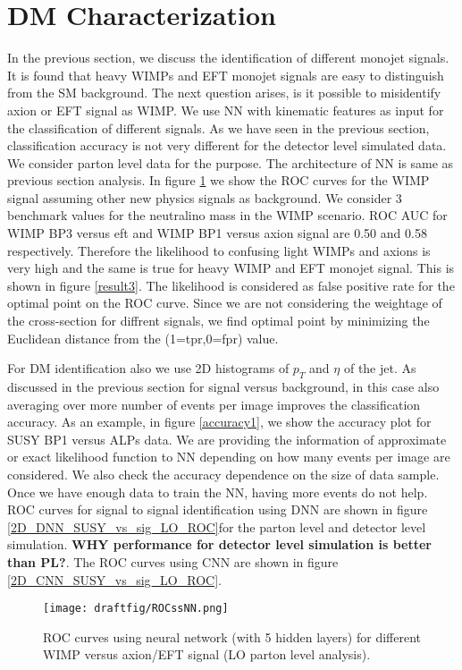 \documentclass[aps,onecolumn,showpacs,superscriptaddress,groupedaddress,nofootinbib,preprint]{revtex4-1}
\begin{document}
\section{DM Characterization}
In the previous section, we discuss the identification of different monojet signals. It is found that heavy WIMPs and EFT monojet signals are easy
to distinguish from the SM background. The next question arises, is it possible to misidentify axion or EFT signal as WIMP. We use NN with kinematic features as input for the 
classification of different signals. As we have seen in the previous section, classification accuracy is not very different for the detector level simulated data. We consider parton level data for the purpose. The architecture of NN is same as previous section analysis. In figure
\ref{result2} we show the ROC curves for the  WIMP signal assuming other new physics signals as background. We consider 3 benchmark values for
the neutralino mass in the WIMP scenario. ROC AUC for WIMP BP3 versus eft and WIMP BP1 versus axion signal are 0.50 and 0.58 respectively. Therefore the
likelihood to confusing light WIMPs and axions is very high and the same is true for heavy WIMP and EFT monojet signal. This is shown in figure \ref{result3}. The likelihood is considered as false positive rate for the optimal point on the ROC curve. Since we are not considering the weightage of the cross-section for diffrent signals, we find optimal point by minimizing the Euclidean distance from the (1=tpr,0=fpr) value.


For DM identification also we use 2D histograms of $p_T$ and $\eta$ of the jet. As discussed in the previous section for signal versus background, in this case also averaging over more number of events per image  improves the classification accuracy. As an example, in figure \ref{accuracy1}, we show the accuracy plot for SUSY BP1 versus ALPs data. We are providing the information of approximate or exact likelihood function to NN depending on how many events per image are considered. We also check the accuracy dependence on the size of data sample. Once we have enough data to train the NN, having more events do not help. 
ROC curves for signal to signal identification using DNN are shown in figure \ref{2D_DNN_SUSY_vs_sig_LO_ROC}for the parton level and detector level simulation. {\textbf{WHY performance for detector level simulation is better than PL?}}. The ROC curves using CNN are shown in figure \ref{2D_CNN_SUSY_vs_sig_LO_ROC}. 

\begin{figure}%
\centering
\texttt{[image: draftfig/ROCssNN.png]}
\caption{ROC curves using neural network (with 5 hidden layers) for different WIMP versus axion/EFT signal (LO parton level analysis). 
}\label{result2}
\end{figure}
\end{document}
